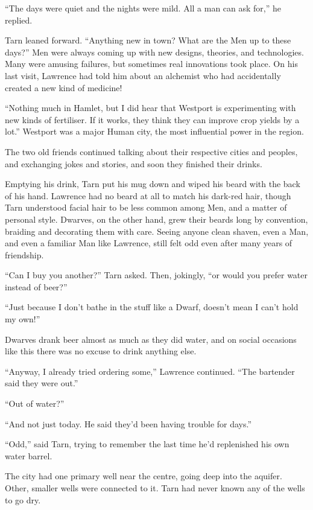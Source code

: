 ``The days were quiet and the nights were mild.  All a man can ask for,'' he replied.


Tarn leaned forward.  ``Anything new in town?  What are the Men up to these days?''  Men were always coming up with new designs, theories, and technologies.  Many were amusing failures, but sometimes real innovations took place.  On his last visit, Lawrence had told him about an alchemist who had accidentally created a new kind of medicine!

``Nothing much in Hamlet, but I did hear that Westport is experimenting with new kinds of fertiliser.  If it works, they think they can improve crop yields by a lot.''  Westport was a major Human city, the most influential power in the region.

The two old friends continued talking about their respective cities and peoples, and exchanging jokes and stories, and soon they finished their drinks.

Emptying his drink, Tarn put his mug down and wiped his beard with the back of his hand.  Lawrence had no beard at all to match his dark-red hair, though Tarn understood facial hair to be less common among Men, and a matter of personal style.  Dwarves, on the other hand, grew their beards long by convention, braiding and decorating them with care.  Seeing anyone clean shaven, even a Man, and even a familiar Man like Lawrence, still felt odd even after many years of friendship.

``Can I buy you another?'' Tarn asked.  Then, jokingly, ``or would you prefer water instead of beer?''

``Just because I don't bathe in the stuff like a Dwarf, doesn't mean I can't hold my own!''

Dwarves drank beer almost as much as they did water, and on social occasions like this there was no excuse to drink anything else.

``Anyway, I already tried ordering some,'' Lawrence continued.  ``The bartender said they were out.''

``Out of water?''

``And not just today.  He said they'd been having trouble for days.''

``Odd,'' said Tarn, trying to remember the last time he'd replenished his own water barrel.

The city had one primary well near the centre, going deep into the aquifer.  Other, smaller wells were connected to it.  Tarn had never known any of the wells to go dry.

